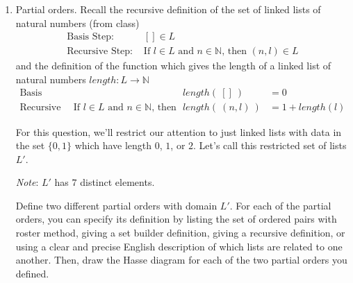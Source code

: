\begin{enumerate}[labelindent=0pt, leftmargin=0pt]
\begin{enumerate}
        \item Does each integer $x$ between $1$ and $4$ (inclusive) have a modular inverse relative to modulus $5$? Does each integer $y$ between $1$ and $5$ (inclusive) have a modular inverse relative to modulus $6$?  Justify your answers using appropriate proof strategies and definitions.

        \item Is there an example of integers $x_1, x_2$ between $1$ and $4$ (inclusive) so that $x_1x_2 \equiv 0 (\textbf{mod } 5)$? Is there an example of integers $y_1, y_2$ between $1$ and $5$ (inclusive) so that $y_1y_2 \equiv 0 (\textbf{mod } 6)$?    Justify your answers using appropriate proof strategies and definitions.

    \end{enumerate}
    


    \item Partial orders. Recall the recursive definition of the set of linked lists of 
    natural numbers (from class)
    \[
    \begin{array}{ll}
        \textrm{Basis Step: } & [] \in L \\
        \textrm{Recursive Step: } & \textrm{If } l \in L\textrm{ and }n \in \mathbb{N} \textrm{, then } (n, l) \in L
    \end{array}
    \]
    and the definition of the function which gives the length of a linked list of natural numbers 
    $length: L \to \mathbb{N}$
        \[
        \begin{array}{llll}
            \textrm{Basis Step:} &  & length(~[]~) &= 0 \\
            \textrm{Recursive Step:} & \textrm{If } l \in L\textrm{ and }n \in \mathbb{N}\textrm{, then  } & length(~(n, l)~)  &= 1+ length(l)
        \end{array}
         \]
     
    For this question, we'll restrict our attention to just linked lists with data in the set $\{0,1\}$
    which have length $0$, $1$, or $2$. Let's call this restricted set of lists $L'$.
    
    {\it Note}: $L'$ has $7$ distinct elements.

    Define two different partial orders with domain $L'$. For each of the partial orders, you  can specify its definition by
    listing the set of ordered pairs with roster method, giving a set builder
    definition, giving a recursive definition, or using a clear and precise English description of which lists are related to one another.
    Then, draw the Hasse diagram for each of the two partial orders you defined.



\end{enumerate}
